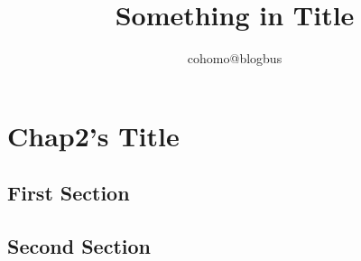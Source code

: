\documentclass{article}
\begin{document}
\title{Something in Title}
\author{cohomo@blogbus}
\date{}
\maketitle
\else
\chapter{Chap2's Title}
\fi
\section{First Section}
\section{Second Section}
\ifx\allfiles\undefined
\end{document}

